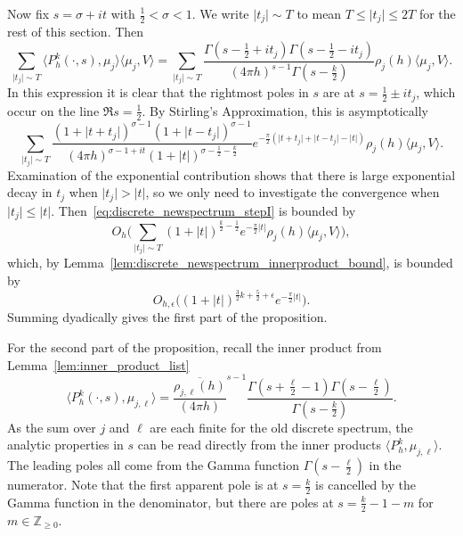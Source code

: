 Now fix $s = \sigma + it$ with $\frac{1}{2} < \sigma < 1$.
We write $\lvert t_j \rvert \sim T$ to mean $T \leq \lvert t_j \rvert \leq 2T$ for the
rest of this section.
Then
\begin{equation}
  \sum_{\lvert t_j \rvert \sim T} \langle P_h^k(\cdot, s), \mu_j \rangle \langle \mu_j, V
  \rangle = \sum_{\lvert t_j \rvert \sim T} \frac{\Gamma(s - \frac{1}{2} + it_j) \Gamma(s
- \frac{1}{2} - it_j)}{(4\pi h)^{s - 1} \Gamma(s - \frac{k}{2})} \rho_j(h) \langle \mu_j,
V \rangle.
\end{equation}
In this expression it is clear that the rightmost poles in $s$ are at $s = \frac{1}{2} \pm
it_j$, which occur on the line $\Re s = \frac{1}{2}$.
By Stirling's Approximation, this is asymptotically
\begin{equation}\label{eq:discrete_newspectrum_stepI}
  \sum_{\lvert t_j \rvert \sim T} \frac{(1 + \lvert t + t_j \rvert)^{\sigma - 1} (1 +
  \lvert t - t_j \rvert)^{\sigma - 1}}{(4\pi h)^{\sigma - 1 + it}(1 + \lvert t
\rvert)^{\sigma - \frac{1}{2} - \frac{k}{2}}} e^{-\frac{\pi}{2}(\lvert t + t_j \rvert +
\lvert t-t_j \rvert - \lvert t \rvert)} \rho_j(h) \langle \mu_j, V \rangle.
\end{equation}
Examination of the exponential contribution shows that there is large exponential decay in
$t_j$ when $\lvert t_j \rvert > \lvert t \rvert$, so we only need to investigate the
convergence when $\lvert t_j \rvert \leq \lvert t \rvert$.
Then~\eqref{eq:discrete_newspectrum_stepI} is bounded by
\begin{equation}
  O_h\Big( \sum_{\lvert t_j \rvert \sim T} (1 + \lvert t \rvert)^{\frac{k}{2} -
  \frac{1}{2}} e^{-\frac{\pi}{2} \lvert t \rvert} \rho_j(h) \langle \mu_j, V \rangle
\Big),
\end{equation}
which, by Lemma~\ref{lem:discrete_newspectrum_innerproduct_bound}, is bounded by
\begin{equation}
  O_{h, \epsilon} \Big( (1 + \lvert t \rvert)^{\frac{3}{2}k + \frac{5}{2} + \epsilon}
  e^{-\frac{\pi}{2}\lvert t \rvert}\Big).
\end{equation}
Summing dyadically gives the first part of the proposition.


For the second part of the proposition, recall the inner product from
Lemma~\ref{lem:inner_product_list}
\begin{equation}
  \langle P_h^k(\cdot, s), \mu_{j, \ell} \rangle =
  \frac{\overline{\rho_{j,\ell}(h)}}{(4\pi h)}^{s-1} \frac{\Gamma(s + \frac{\ell}{2} - 1)
  \Gamma(s - \frac{\ell}{2})}{\Gamma(s - \frac{k}{2})}.
\end{equation}
As the sum over $j$ and $\ell$ are each finite for the old discrete spectrum, the analytic
properties in $s$ can be read directly from the inner products $\langle P_h^k, \mu_{j,
\ell} \rangle$.
The leading poles all come from the Gamma function $\Gamma(s - \frac{\ell}{2})$ in the
numerator.
Note that the first apparent pole is at $s = \frac{k}{2}$ is cancelled by the Gamma
function in the denominator, but there are poles at $s = \frac{k}{2} - 1 - m$ for $m \in
\mathbb{Z}_{\geq 0}$.



